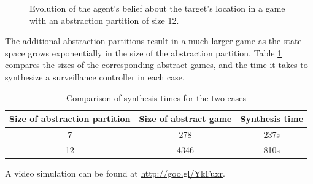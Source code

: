 \begin{figure}
\begin{minipage}{5.0cm}
{		}
		
	\end{minipage}
	
	
	\caption{Evolution of the agent's belief about the target's location in a game  with an abstraction partition of size 12.
	}
	\label{fig:case1fineexp}
	
\end{figure}


The additional abstraction partitions result in a much larger game as the state space grows exponentially in the size of the abstraction partition. Table \ref{tab:exp1} compares the sizes of the corresponding abstract games, and the time it takes to synthesize a surveillance controller in each case.


\begin{table}[h!]
	\centering
	\begin{tabular}{c|c|c}
	Size of abstraction partition & Size of abstract game & Synthesis time \\ \hline \hline
		7 & 278 & 237s \\ 
		12 & 4346 & 810s \\ 
	\end{tabular}\caption{Comparison of synthesis times for the two cases} \label{tab:exp1}
\end{table}


A video simulation can be found at \url{http://goo.gl/YkFuxr}.

